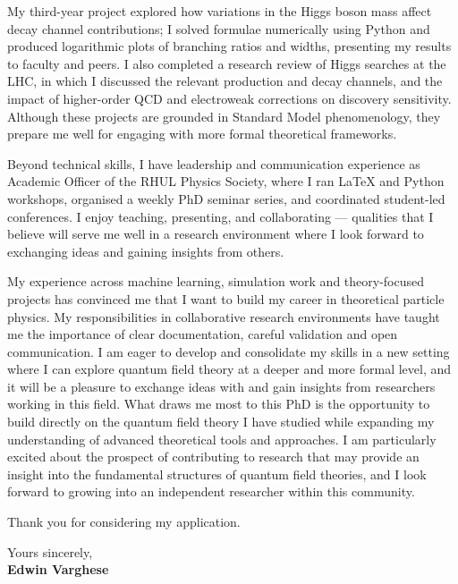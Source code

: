 \documentclass[11pt]{report}
\begin{document}
\begin{titlepage}
		My third-year project explored how variations in the Higgs boson mass affect decay channel contributions; I solved formulae numerically using Python and produced logarithmic plots of branching ratios and widths, presenting my results to faculty and peers. I also completed a research review of Higgs searches at the LHC, in which I discussed the relevant production and decay channels, and the impact of higher-order QCD and electroweak corrections on discovery sensitivity. Although these projects are grounded in Standard Model phenomenology, they prepare me well for engaging with more formal theoretical frameworks.\\
		\vspace{0.7em}
		
		Beyond technical skills, I have leadership and communication experience as Academic Officer of the RHUL Physics Society, where I ran LaTeX and Python workshops, organised a weekly PhD seminar series, and coordinated student-led conferences. I enjoy teaching, presenting, and collaborating --- qualities that I believe will serve me well in a research environment where I look forward to exchanging ideas and gaining insights from others.\\
		\vspace{0.7em} 
		
		My experience across machine learning, simulation work and theory-focused projects has convinced me that I want to build my career in theoretical particle physics. My responsibilities in collaborative research environments have taught me the importance of clear documentation, careful validation and open communication. I am eager to develop and consolidate my skills in a new setting where I can explore quantum field theory at a deeper and more formal level, and it will be a pleasure to exchange ideas with and gain insights from researchers working in this field. What draws me most to this PhD is the opportunity to build directly on the quantum field theory I have studied while expanding my understanding of advanced theoretical tools and approaches. I am particularly excited about the prospect of contributing to research that may provide an insight into the fundamental structures of quantum field theories, and I look forward to growing into an independent researcher within this community.\\
		\vspace{0.7em}
		
		
		Thank you for considering my application.\\
		\vspace{5em}
		
		\raggedright Yours sincerely,\\
		\vspace{0.7em}
		\textbf{Edwin Varghese}
		
	\end{titlepage}
\end{document}
